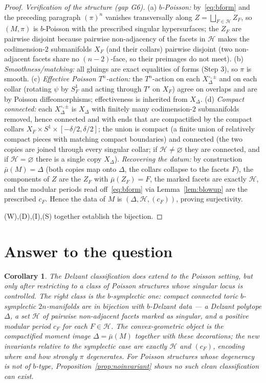 \documentclass{amsart}
\newtheorem{corollary}{Corollary}
\theoremstyle{definition}
\begin{document}
\begin{proof}
\emph{Verification of the structure (gap G6).}
(a) \emph{$b$-Poisson:} by~\eqref{eq:bform} and the preceding paragraph
$(\pi)^n$ vanishes transversally along $Z=\bigsqcup_{F\in\mathcal H} Z_F$, so
$(M,\pi)$ is $b$-Poisson with the prescribed singular hypersurfaces; the
$Z_F$ are pairwise disjoint because pairwise non-adjacency of the facets in
$\mathcal H$ makes the codimension-$2$ submanifolds $X_F$ (and their collars)
pairwise disjoint (two non-adjacent facets share no $(n-2)$-face, so their
preimages do not meet). (b) \emph{Smoothness/matching:} all gluings are exact
equalities of forms (Step 3), so $\pi$ is smooth. (c) \emph{Effective Poisson
$T^n$-action:} the $T^n$-action on each $X_\Delta^{\circ,\pm}$ and on each collar
(rotating $\psi$ by $S^1_F$ and acting through $T'$ on $X_F$) agree on overlaps
and are by Poisson diffeomorphisms; effectiveness is inherited from $X_\Delta$.
(d) \emph{Compact connected:} each $X_\Delta^{\circ,\pm}$ is $X_\Delta$ with
finitely many codimension-$2$ submanifolds removed, hence connected and with
ends that are compactified by the compact collars $X_F\times S^1\times[-\delta/2,
\delta/2]$; the union is compact (a finite union of relatively compact pieces
with matching compact boundaries) and connected (the two copies are joined
through every singular collar; if $\mathcal H\neq\varnothing$ they are connected,
and if $\mathcal H=\varnothing$ there is a single copy $X_\Delta$).
\emph{Recovering the datum:} by construction $\bar\mu(M)=\Delta$ (both copies map
onto $\Delta$, the collars collapse to the facets $F$), the components of $Z$ are
the $Z_F$ with $\bar\mu(Z_F)=F$, the marked facets are exactly $\mathcal H$, and
the modular periods read off~\eqref{eq:bform} via Lemma~\ref{lem:blowup} are the
prescribed $c_F$. Hence the data of $M$ is $(\Delta,\mathcal H,(c_F))$, proving
surjectivity.

\medskip
(W),(D),(I),(S) together establish the bijection.
\end{proof}

\section{Answer to the question}

\begin{corollary}
The Delzant classification \emph{does} extend to the Poisson setting, but only
after restricting to a class of Poisson structures whose singular locus is
controlled. The right class is the $b$-symplectic one: compact connected toric
$b$-symplectic $2n$-manifolds are in bijection with $b$-Delzant data --- a
Delzant polytope $\Delta$, a set $\mathcal H$ of pairwise non-adjacent facets
marked as singular, and a positive modular period $c_F$ for each $F\in\mathcal
H$. The convex-geometric object is the compactified moment image $\Delta=
\bar\mu(M)$ together with these decorations; the new invariants relative to the
symplectic case are exactly $\mathcal H$ and $(c_F)$, encoding where and how
strongly $\pi$ degenerates. For Poisson structures whose degeneracy is \emph{not}
of $b$-type, Proposition~\ref{prop:noinvariant} shows no such clean
classification can exist.
\end{corollary}
\end{document}
